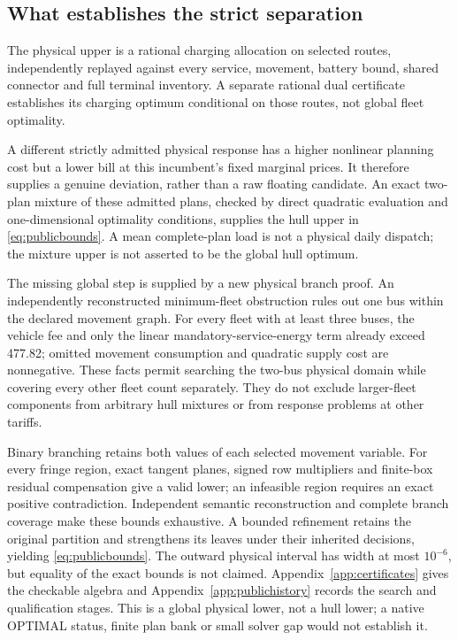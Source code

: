 \subsection{What establishes the strict separation}
The physical upper is a rational charging allocation on selected routes,
independently replayed against every service, movement, battery bound,
shared connector and full terminal inventory. A separate rational dual
certificate establishes its charging optimum conditional on those routes,
not global fleet optimality.

A different strictly admitted physical response has a higher nonlinear
planning cost but a lower bill at this incumbent's fixed marginal prices.
It therefore supplies a genuine deviation, rather than a raw floating
candidate. An exact two-plan mixture of these admitted plans, checked by
direct quadratic evaluation and one-dimensional optimality conditions,
supplies the hull upper in \eqref{eq:publicbounds}. A mean complete-plan
load is not a physical daily dispatch; the mixture upper is not asserted
to be the global hull optimum.

The missing global step is supplied by a new physical branch proof.
An independently reconstructed minimum-fleet obstruction rules out one bus
within the declared movement graph.
For every fleet with at least three buses, the vehicle fee and only the
linear mandatory-service-energy term already exceed 477.82; omitted
movement consumption and quadratic supply cost are nonnegative. These
facts permit searching the two-bus physical domain while covering every
other fleet count separately. They do not exclude larger-fleet components
from arbitrary hull mixtures or from response problems at other tariffs.

Binary branching retains both values of each selected movement variable.
For every fringe region, exact tangent planes, signed row multipliers and
finite-box residual compensation give a valid lower; an infeasible region
requires an exact positive contradiction. Independent semantic reconstruction
and complete branch coverage make these bounds exhaustive. A bounded
refinement retains the original partition and strengthens its leaves under
their inherited decisions, yielding \eqref{eq:publicbounds}. The outward
physical interval has width at most $10^{-6}$, but equality of the exact
bounds is not claimed. Appendix~\ref{app:certificates} gives the checkable
algebra and Appendix~\ref{app:publichistory} records the search and
qualification stages. This is a global physical lower, not a hull lower;
a native OPTIMAL status, finite plan bank or small solver gap would not
establish it.

